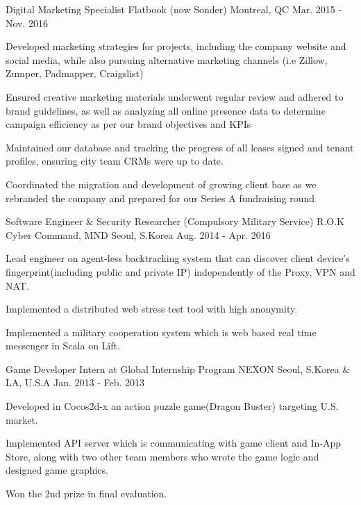 \begin{cventries}
  \cventry
    {Digital Marketing Specialist} %
    {Flatbook (now Sonder)} %
    {Montreal, QC} %
    {Mar. 2015 - Nov. 2016} %
    {
      \begin{cvitems} %
        \item {Developed marketing strategies for projects, including the company website and social media, while also pursuing alternative marketing channels (i.e Zillow, Zumper, Padmapper, Craigslist)}
        \item {Ensured creative marketing materials underwent regular review and adhered to brand guidelines, as well as analyzing all online presence data to determine campaign efficiency as per our brand objectives and KPIs}
        \item {Maintained our database and tracking the progress of all leases signed and tenant profiles, ensuring city team CRMs were up to date.}
        \item {Coordinated the migration and development of growing client base as we rebranded the company and prepared for our Series A fundraising round}
      \end{cvitems}
    }

  \cventry
    {Software Engineer \& Security Researcher (Compulsory Military Service)} %
    {R.O.K Cyber Command, MND} %
    {Seoul, S.Korea} %
    {Aug. 2014 - Apr. 2016} %
    {
      \begin{cvitems} %
        \item {Lead engineer on agent-less backtracking system that can discover client device's fingerprint(including public and private IP) independently of the Proxy, VPN and NAT.}
        \item {Implemented a distributed web stress test tool with high anonymity.}
        \item {Implemented a military cooperation system which is web based real time messenger in Scala on Lift.}
      \end{cvitems}
    }

  \cventry
    {Game Developer Intern at Global Internship Program} %
    {NEXON} %
    {Seoul, S.Korea \& LA, U.S.A} %
    {Jan. 2013 - Feb. 2013} %
    {
      \begin{cvitems} %
        \item {Developed in Cocos2d-x an action puzzle game(Dragon Buster) targeting U.S. market.}
        \item {Implemented API server which is communicating with game client and In-App Store, along with two other team members who wrote the game logic and designed game graphics.}
        \item {Won the 2nd prize in final evaluation.}
      \end{cvitems}
    }


\end{cventries}
